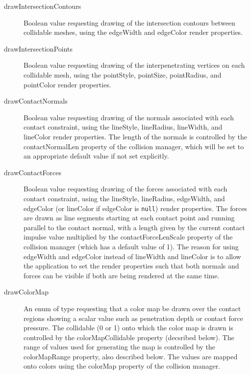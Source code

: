 \begin{description}

\item[drawIntersectionContours]\mbox{}

Boolean value requesting drawing of the intersection contours between
collidable meshes, using the {\sf edgeWidth} and {\sf edgeColor} render
properties.

\item[drawIntersectionPoints]\mbox{}

Boolean value requesting drawing of the interpenetrating vertices on
each collidable mesh, using the {\sf pointStyle}, {\sf pointSize}, {\sf
pointRadius}, and {\sf pointColor} render properties.

\item[drawContactNormals]\mbox{}

Boolean value requesting drawing of the normals associated with each
contact constraint, using the {\sf lineStyle}, {\sf lineRadius}, {\sf
lineWidth}, and {\sf lineColor} render properties. The length of the
normals is controlled by the {\sf contactNormalLen} property of the
collision manager, which will be set to an appropriate default value
if not set explicitly.

\item[drawContactForces]\mbox{}

Boolean value requesting drawing of the forces associated with each
contact constraint, using the {\sf lineStyle}, {\sf lineRadius}, {\sf
edgeWidth}, and {\sf edgeColor} (or {\sf lineColor} if {\sf edgeColor}
is {\tt null}) render properties.  The forces are drawn as line
segments starting at each contact point and running parallel to the
contact normal, with a length given by the current contact impulse
value multiplied by the {\sf contactForceLenScale} property of the
collision manager (which has a default value of 1).  The reason for
using {\sf edgeWidth} and {\sf edgeColor} instead of {\sf lineWidth}
and {\sf lineColor} is to allow the application to set the render
properties such that both normals and forces can be visible if both
are being rendered at the same time.

\item[drawColorMap]\mbox{}

An enum of type
requesting that a color map be drawn over the contact regions showing
a scalar value such as penetration depth or contact force pressure.
The collidable (0 or 1) onto which the color map is drawn is controlled by
the {\sf colorMapCollidable} property (decsribed below). The range of values
used for generating the map is controlled by the {\sf colorMapRange}
property, also described below.  The values are mapped onto colors
using the {\sf colorMap} property of the collision manager.


\end{description}
